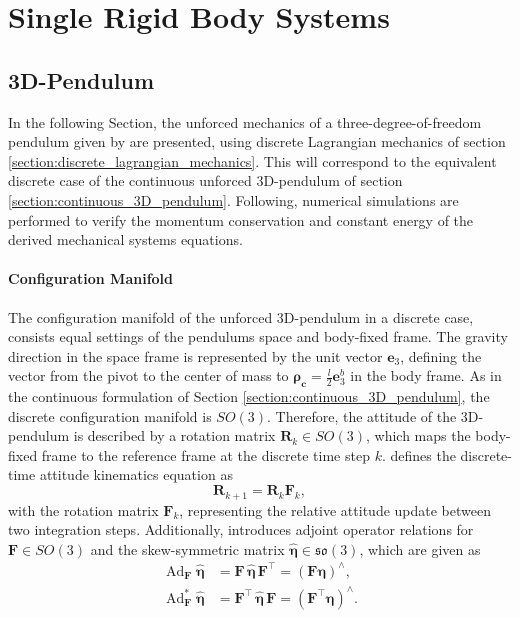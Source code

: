 \section{Single Rigid Body Systems}

\subsection{3D-Pendulum}
\label{sec:discrete_3D_pendulum}

In the following Section, the unforced mechanics of a three-degree-of-freedom pendulum given by \cite{Lee2008} are presented, using discrete Lagrangian mechanics of section \ref{section:discrete_lagrangian_mechanics}. This will correspond to the equivalent discrete case of the continuous unforced 3D-pendulum of section \ref{section:continuous_3D_pendulum}. Following, numerical simulations are performed to verify the momentum conservation and constant energy of the derived mechanical systems equations. 

\paragraph{Configuration Manifold}

The configuration manifold of the unforced 3D-pendulum in a discrete case, consists equal settings of the pendulums space and body-fixed frame. The gravity direction in the space frame is represented by the unit vector $\bm{e}_3$, defining the vector from the pivot to the center of mass to $\bm{\rho_{c}}= \frac{l}{2} \bm{e}_3^b$ in the body frame. As in the continuous formulation of Section \ref{section:continuous_3D_pendulum}, the discrete configuration manifold is $SO(3)$. Therefore, the attitude of the 3D-pendulum is described by a rotation matrix $\bm{R}_k \in SO(3)$, which maps the body-fixed frame to the reference frame at the discrete time step $k$. \cite{Lee2008} defines the discrete-time attitude kinematics equation as
\begin{equation}\label{eq:discrete_attitude_kinematics_equation_SO3}
    \bm{R}_{k+1}= \bm{R}_k \bm{F}_k,
\end{equation}
with the rotation matrix $\bm{F}_k$, representing the relative attitude update between two integration steps. Additionally, \cite{Lee2008} introduces adjoint operator relations for $\bm{F} \in SO(3)$ and the skew-symmetric matrix $\hat{\bm{\eta}} \in \mathfrak{so}(3)$, which are given as
\begin{align}
\operatorname{Ad}_{\bm{F}} \hat{\bm{\eta}}
&=
\bm{F}\,\hat{\bm{\eta}}\,\bm{F}^{\top}
=
(\bm{F}\bm{\eta})^\wedge,
\\
\operatorname{Ad}^{*}_{\bm{F}} \hat{\bm{\eta}}
&=
\bm{F}^{\top}\,\hat{\bm{\eta}}\,\bm{F}
=
(\bm{F}^{\top}\bm{\eta})^\wedge.\label{eq:discrete_coadjoint}
\end{align}

